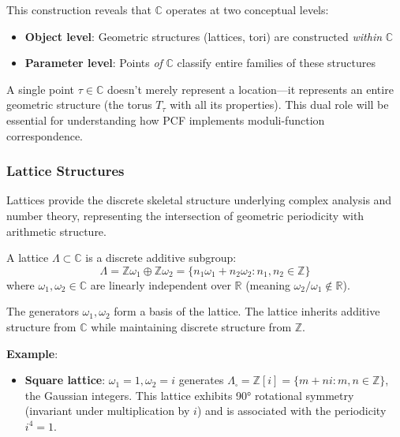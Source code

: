    \begin{Note} \label{obs:dual-conceptual-role}
        This construction reveals that $\mathbb{C}$ operates at two conceptual levels:
        \begin{itemize}
            \item \textbf{Object level}: Geometric structures (lattices, tori) are constructed \textit{within} $\mathbb{C}$
            \item \textbf{Parameter level}: Points \textit{of} $\mathbb{C}$ classify entire families of these structures
        \end{itemize}
    \end{Note}

    A single point $\tau \in \mathbb{C}$ doesn't merely represent a location—it represents an entire geometric structure (the torus $T_\tau$ with all its properties). This dual role will be essential for understanding how PCF implements moduli-function correspondence.

    \subsubsection{Lattice Structures} \label{sec:complex-lattices}

    Lattices provide the discrete skeletal structure underlying complex analysis and number theory, representing the intersection of geometric periodicity with arithmetic structure.

    \begin{Definition} \label{def:lattice-in-C}
        A lattice $\Lambda \subset \mathbb{C}$ is a discrete additive subgroup:
        \[
            \Lambda = \mathbb{Z}\omega_1 \oplus \mathbb{Z}\omega_2 = \{n_1\omega_1 + n_2\omega_2 : n_1, n_2 \in \mathbb{Z}\}
        \]
        where $\omega_1, \omega_2 \in \mathbb{C}$ are linearly independent over $\mathbb{R}$ (meaning $\omega_2/\omega_1 \notin \mathbb{R}$).
    \end{Definition}

    The generators $\omega_1, \omega_2$ form a basis of the lattice. The lattice inherits additive structure from $\mathbb{C}$ while maintaining discrete structure from $\mathbb{Z}$.

    \textbf{Example}:
    \begin{itemize}
        \item \textbf{Square lattice}: $\omega_1 = 1, \omega_2 = i$ generates $\Lambda_\square = \mathbb{Z}[i] = \{m + ni : m, n \in \mathbb{Z}\}$, the Gaussian integers. This lattice exhibits 90° rotational symmetry (invariant under multiplication by $i$) and is associated with the periodicity $i^4 = 1$.
    \end{itemize}

